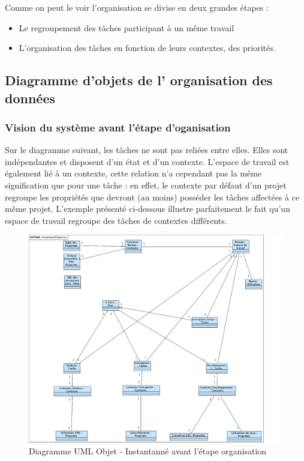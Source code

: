 Comme on peut le voir l'organisation se divise en deux grandes étapes :\\
\begin{itemize}
\item Le regroupement des tâches participant à un même travail
\item L'organisation des tâches en fonction de leurs contextes, des priorités.
\end{itemize}


\subsection*{Diagramme d'objets de l' organisation des données}

\subsubsection{Vision du système avant l'étape d'oganisation}
Sur le diagramme suivant, les tâches ne sont pas reliées entre elles. Elles sont indépendantes et disposent d'un état et d'un contexte. L'espace de travail est également lié à un contexte, cette relation n'a cependant pas la même signification que pour une tâche : en effet, le contexte par défaut d'un projet regroupe les propriétés que devront (au moins) posséder les tâches affectées à ce même projet. L'exemple présenté ci-dessous illustre parfaitement le fait qu'un espace de travail regroupe des tâches de contextes différents.

\begin{figure}[H]
\begin{center}
\includegraphics[scale=0.35,angle=90]{diagrams/instantaneOrganiserBefore.png}
\caption{Diagramme UML Objet - Instantanné avant l'étape organisation}
\end{center}
\end{figure}


